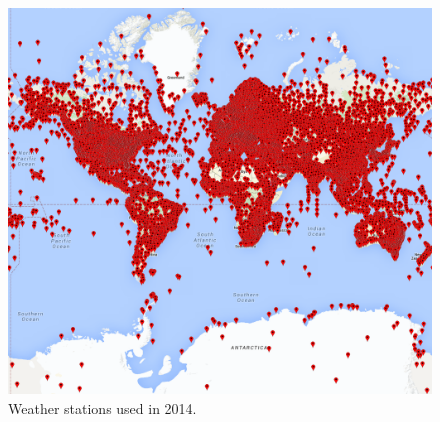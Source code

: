 \documentclass{vldb}
\begin{document}
\begin{figure}[tbh]
\includegraphics[width=1\linewidth]{stations2014}
\caption{Weather stations used in 2014.}
\label{fig:stations2014}
\end{figure}


\FloatBarrier
\clearpage





\balance
\printbibliography
\end{document}
